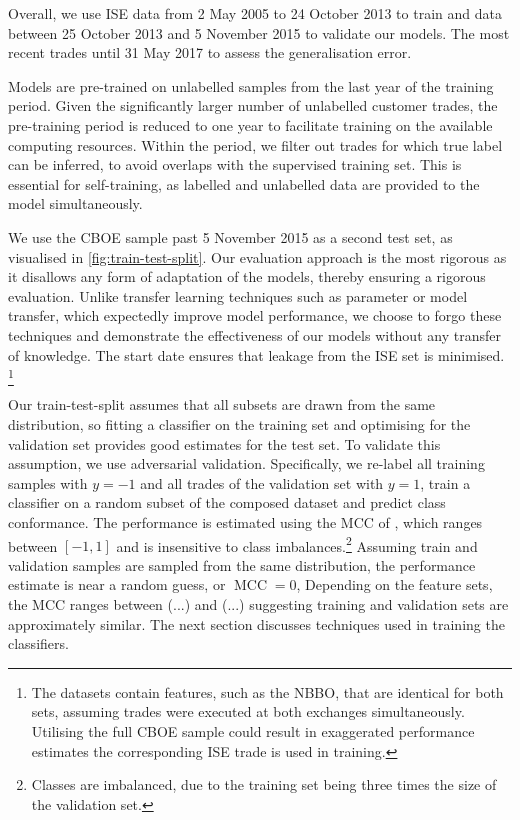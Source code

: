 Overall, we use \gls{ISE} data from 2 May 2005 to 24 October 2013 to train and data between 25 October 2013 and 5 November 2015 to validate our models. The most recent trades until 31 May 2017 to assess the generalisation error.

Models are pre-trained on unlabelled samples from the last year of the training period. Given the significantly larger number of unlabelled customer trades, the pre-training period is reduced to one year to facilitate training on the available computing resources. Within the period, we filter out trades for which true label can be inferred, to avoid overlaps with the supervised training set. This is essential for self-training, as labelled and unlabelled data are provided to the model simultaneously.

We use the \gls{CBOE} sample past 5 November 2015 as a second test set, as visualised in \cref{fig:train-test-split}. Our evaluation approach is the most rigorous as it disallows any form of adaptation of the models, thereby ensuring a rigorous evaluation. Unlike transfer learning techniques such as parameter or model transfer, which expectedly improve model performance, we choose to forgo these techniques and demonstrate the effectiveness of our models without any transfer of knowledge. The start date ensures that leakage from the \gls{ISE} set is minimised. \footnote{The datasets contain features, such as the \gls{NBBO}, that are identical for both sets, assuming trades were executed at both exchanges simultaneously. Utilising the full \gls{CBOE} sample could result in exaggerated performance estimates the corresponding \gls{ISE} trade is used in training.}

Our train-test-split assumes that all subsets are drawn from the same distribution, so fitting a classifier on the training set and optimising for the validation set provides good estimates for the test set. To validate this assumption, we use adversarial validation. Specifically, we re-label all training samples with $y=-1$ and all trades of the validation set with $y=1$, train a classifier on a random subset of the composed dataset and predict class conformance. The performance is estimated using the \gls{MCC} of \textcite[][445]{matthewsComparisonPredictedObserved1975}, which ranges between $\left[-1, 1\right]$ and is insensitive to class imbalances.\footnote{Classes are imbalanced, due to the training set being three times the size of the validation set.} Assuming train and validation samples are sampled from the same distribution, the performance estimate is near a random guess, or $\operatorname{MCC} = 0$, Depending on the feature sets, the \gls{MCC} ranges between (...) and (...) suggesting training and validation sets are approximately similar. The next section discusses techniques used in training the classifiers.

